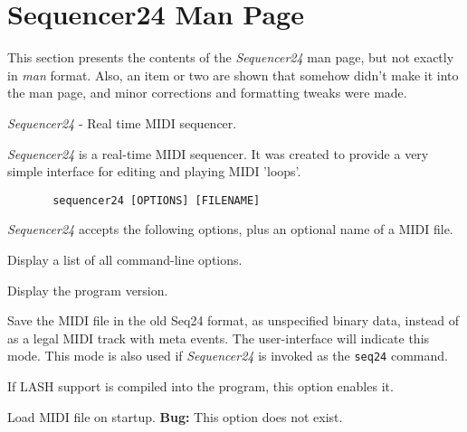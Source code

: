 %
%
%

\section{Sequencer24 Man Page}
\label{sec:seq24_man_page}

   This section presents the contents of the \textsl{Sequencer24} man page, but
   not exactly in \textsl{man} format.  Also, an item or two are shown that
   somehow didn't make it into the man page, and minor corrections and
   formatting tweaks were made.

   \textsl{Sequencer24} - Real time MIDI sequencer.

   \textsl{Sequencer24} is a real-time MIDI sequencer. It was created to provide a
   very simple interface for editing and playing MIDI 'loops'.

   \begin{verbatim}
       sequencer24 [OPTIONS] [FILENAME]
   \end{verbatim}

   \textsl{Sequencer24} accepts the following options, plus an optional name of a
   MIDI file.

   \setcounter{ItemCounter}{0}      %

      Display a list of all command-line options.

      Display the program version.

      Save the MIDI file in the old Seq24 format, as unspecified
      binary data, instead of as a legal MIDI track with meta events.
      The user-interface will indicate this mode.  This mode is also
      used if \textsl{Sequencer24} is invoked as the
      \texttt{seq24} command.

      If LASH support is compiled into the program, this option
      enables it.

      Load MIDI file on startup.
      \textbf{Bug:}
      This option does not exist.

